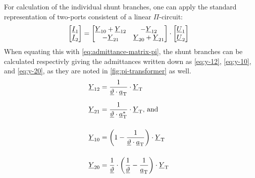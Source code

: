 For calculation of the individual shunt branches, one can apply the standard representation of two-ports consistent of a linear $\Pi$-circuit:
\begin{align}
    \begin{bmatrix}
        \underline{I}_1 \\ \underline{I}_2
    \end{bmatrix}=
    \begin{bmatrix}
        \underline{Y}_{10} + \underline{Y}_{12}& -\underline{Y}_{12} \\
        -\underline{Y}_{21} & \underline{Y}_{20} + \underline{Y}_{21}
    \end{bmatrix} \cdot
    \begin{bmatrix}
        \underline{U}_1 \\ \underline{U}_2
    \end{bmatrix} \notag %
\end{align}
When equating this with \autoref{eq:admittance-matrix-pi}, the shunt branches can be calculated respectivly giving the admittances written down as \autoref{eq:y-12}, \autoref{eq:y-10}, and \autoref{eq:y-20}, as they are noted in \autoref{fig:pi-transformer} as well. \autocite{milano_2010,burlakin_2024}
\begin{align}
    \underline{Y}_{12}&=\frac{1}{\underline{\vartheta} \cdot \underline{a}_\mathrm{T}} \cdot \underline{Y}_\mathrm{T} \notag \\[6pt]
    \underline{Y}_{21}&=\frac{1}{\underline{\vartheta} \cdot \underline{a}_\mathrm{T}^*} \cdot \underline{Y}_\mathrm{T}\text{, and} \label{eq:y-12} \\[12pt]
    \underline{Y}_{10}&=\bigg(1 - \frac{1}{\underline{\vartheta} \cdot \underline{a}_\mathrm{T}}\bigg) \cdot \underline{Y}_\mathrm{T} \label{eq:y-10} \\[12pt]
    \underline{Y}_{20}&=\frac{1}{\underline{\vartheta}} \cdot \bigg(\frac{1}{\underline{\vartheta}} - \frac{1}{\underline{a}_\mathrm{T}}\bigg) \cdot \underline{Y}_\mathrm{T} \label{eq:y-20} 
\end{align}

